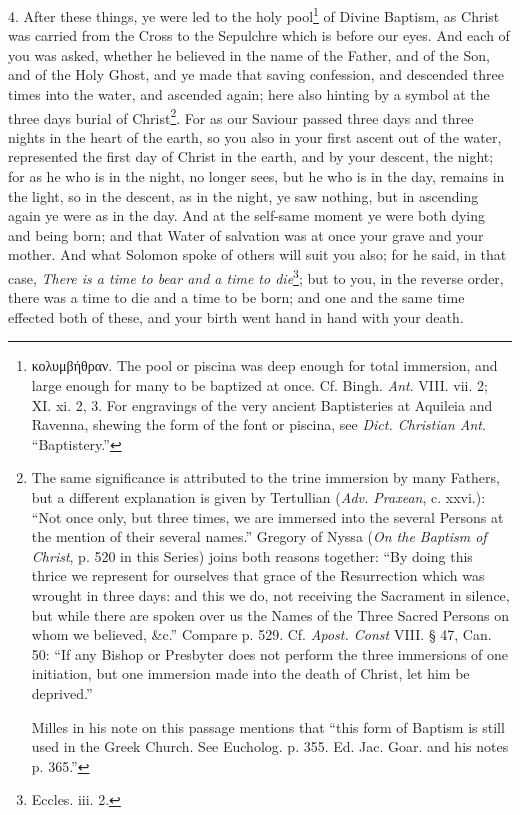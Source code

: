 4. After these things, ye were led to the holy pool\footnote{\textgreek{κολυμβήθραν}. The pool or piscina was deep enough for total immersion, and large enough for many to be baptized at once. Cf. Bingh. \emph{Ant}. VIII. vii. 2; XI. xi. 2, 3. For engravings of the very ancient Baptisteries at Aquileia and Ravenna, shewing the form of the font or piscina, see \emph{Dict. Christian Ant}. “Baptistery.”} of Divine Baptism, as Christ was carried from the Cross to the Sepulchre which is before our eyes. And each of you was asked, whether he believed in the name of the Father, and of the Son, and of the Holy Ghost, and ye made that saving confession, and descended three times into the water, and ascended again; here also hinting by a symbol at the three days burial of Christ\footnote{The same significance is attributed to the trine immersion by many Fathers, but a different explanation is given by Tertullian (\emph{Adv. Praxean}, c. xxvi.): “Not once only, but three times, we are immersed into the several Persons at the mention of their several names.” Gregory of Nyssa (\emph{On the Baptism of Christ}, p. 520 in this Series) joins both reasons together: “By doing this thrice we represent for ourselves that grace of the Resurrection which was wrought in three days: and this we do, not receiving the Sacrament in silence, but while there are spoken over us the Names of the Three Sacred Persons on whom we believed, \&c.” Compare p. 529. Cf. \emph{Apost. Const} VIII. § 47, Can. 50: “If any Bishop or Presbyter does not perform the three immersions of one initiation, but one immersion made into the death of Christ, let him be deprived.” \par Milles in his note on this passage mentions that “this form of Baptism is still used in the Greek Church. See Eucholog. p. 355. Ed. Jac. Goar. and his notes p. 365.”}. For as our Saviour passed three days and three nights in the heart of the earth, so you also in your first ascent out of the water, represented the first day of Christ in the earth, and by your descent, the night; for as he who is in the night, no longer sees, but he who is in the day, remains in the light, so in the descent, as in the night, ye saw nothing, but in ascending again ye were as in the day. And at the self-same moment ye were both dying and being born; and that Water of salvation was at once your grave and your mother. And what Solomon spoke of others will suit you also; for he said, in that case, \emph{There is a time to bear and a time to die}\footnote{Eccles. iii. 2.}; but to you, in the reverse order, there was a time to die and a time to be born; and one and the same time effected both of these, and your birth went hand in hand with your death.

